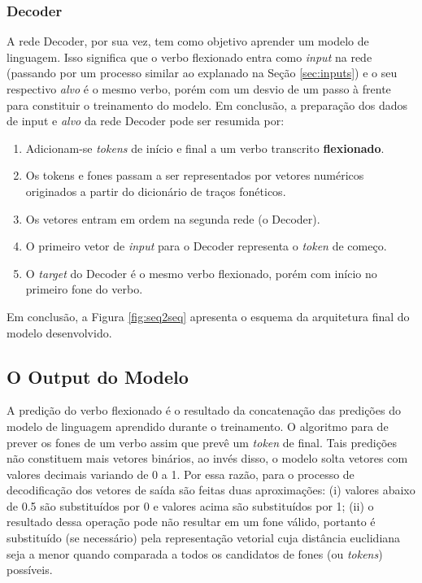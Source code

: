 \subsubsection{Decoder}

A rede Decoder, por sua vez, tem como objetivo aprender um modelo de linguagem. Isso significa que o verbo flexionado entra como \textit{input} na rede (passando por um processo similar ao explanado na Seção \ref{sec:inputs}) e o seu respectivo \textit{alvo} é o mesmo verbo, porém com um desvio de um passo à frente para constituir o treinamento do modelo. Em conclusão, a preparação dos dados de input e \textit{alvo} da rede Decoder pode ser resumida por:  

\begin{enumerate}
    \item Adicionam-se \textit{tokens} de início e final a um verbo transcrito \textbf{flexionado}.
    \item Os tokens e fones passam a ser representados por vetores numéricos originados a partir do dicionário de traços fonéticos.
    \item Os vetores entram em ordem na segunda rede (o Decoder).
    \item O primeiro vetor de \textit{input} para o Decoder representa o \textit{token} de começo.
    \item O \textit{target} do Decoder é o mesmo verbo flexionado, porém com início no primeiro fone do verbo.
\end{enumerate}

Em conclusão, a Figura \ref{fig:seq2seq} apresenta o esquema da arquitetura final do modelo desenvolvido. 



 \subsection{O Output do Modelo}

A predição do verbo flexionado é o resultado da concatenação das predições do modelo de linguagem aprendido durante o treinamento. O algoritmo para de prever os fones de um verbo assim que prevê um \textit{token} de final. Tais predições não constituem mais vetores binários, ao invés disso, o modelo solta vetores com valores decimais variando de 0 a 1. Por essa razão, para o processo de decodificação dos vetores de saída são feitas duas aproximações: (i) valores abaixo de 0.5 são substituídos por 0 e valores acima são substituídos por 1; (ii) o resultado dessa operação pode não resultar em um fone válido, portanto é substituído (se necessário) pela representação vetorial cuja distância euclidiana seja a menor quando comparada a todos os candidatos de fones (ou \textit{tokens}) possíveis. 

